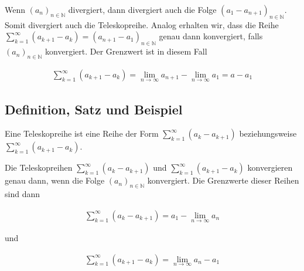 \documentclass[fontsize=9pt,
               parskip=half-,
               DIV=14,
               listof=chapterentry,
               tocflat]{scrbook}
\begin{document}
Wenn $(a_{n})_{n\in \mathbb {N} }$ divergiert, dann divergiert auch die Folge $(a_{1}-a_{n+1})_{n\in \mathbb {N} }$. Somit divergiert auch die Teleskopreihe. Analog erhalten wir, dass die Reihe $\sum _{k=1}^{\infty }(a_{k+1}-a_{k})=(a_{n+1}-a_{1})_{n\in \mathbb {N} }$ genau dann konvergiert, falls $(a_{n})_{n\in \mathbb {N} }$ konvergiert. Der Grenzwert ist in diesem Fall

\begin{align*}
\sum _{k=1}^{\infty }(a_{k+1}-a_{k})=\lim _{n\to \infty }a_{n+1}-\lim _{n\to \infty }a_{1}=a-a_{1}
\end{align*}

\subsection{Definition, Satz und Beispiel}

\begin{definition*}[Teleskopreihe]
Eine Teleskopreihe ist eine Reihe der Form $\sum _{k=1}^{\infty }(a_{k}-a_{k+1})$ beziehungsweise $\sum _{k=1}^{\infty }(a_{k+1}-a_{k})$.

\end{definition*}

\begin{theorem*}
Die Teleskopreihen $\sum _{k=1}^{\infty }(a_{k}-a_{k+1})$ und $\sum _{k=1}^{\infty }(a_{k+1}-a_{k})$ konvergieren genau dann, wenn die Folge $(a_{n})_{n\in \mathbb {N} }$ konvergiert. Die Grenzwerte dieser Reihen sind dann

\begin{align*}
\sum _{k=1}^{\infty }(a_{k}-a_{k+1})=a_{1}-\lim _{n\to \infty }a_{n}
\end{align*}

und

\begin{align*}
\sum _{k=1}^{\infty }(a_{k+1}-a_{k})=\lim _{n\to \infty }a_{n}-a_{1}
\end{align*}

\end{theorem*}
\end{document}
